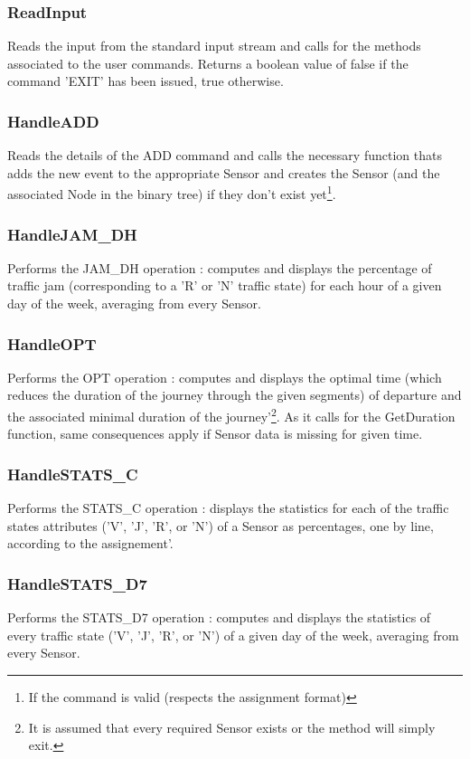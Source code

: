 \documentclass[10pt]{article}
\begin{document}
\subsubsection*{ReadInput}
Reads the input from the standard input stream and calls for the methods associated to the user commands. Returns a boolean value of false if the command 'EXIT' has been issued, true otherwise.

\subsubsection*{HandleADD}
Reads the details of the ADD command and calls the necessary function thats adds the new event to the appropriate Sensor and creates the Sensor (and the associated Node in the binary tree) if they don't exist yet\footnote{ If the command is valid (respects the assignment format)}.

\subsubsection*{HandleJAM\_DH}
Performs the JAM\_DH operation : computes and displays the percentage of traffic jam (corresponding to a 'R' or 'N' traffic state) for each hour of a given day of the week, averaging from every Sensor\footnotemark[2].

\subsubsection*{HandleOPT}
Performs the OPT operation : computes and displays the optimal time (which reduces the duration of the journey through the given segments) of departure and the associated minimal duration of the journey\footnotemark[2]'\footnote{ It is assumed that every required Sensor exists or the method will simply exit.}. As it calls for the GetDuration function, same consequences apply if Sensor data is missing for given time.

\subsubsection*{HandleSTATS\_C}
Performs the STATS\_C operation : displays the statistics for each of the traffic states attributes ('V', 'J', 'R', or 'N') of a Sensor as percentages, one by line, according to the assignement\footnotemark[2]'\footnotemark[3].

\subsubsection*{HandleSTATS\_D7}
Performs the STATS\_D7 operation : computes and displays the statistics of every traffic state ('V', 'J', 'R', or 'N') of a given day of the week, averaging from every Sensor\footnotemark[2].
\end{document}
